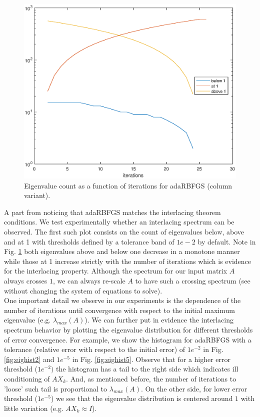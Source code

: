 \documentclass[12pt,conference,compsocconf]{IEEEtran}
\begin{document}
\begin{figure}[H]
  \centering
  \includegraphics[height=0.7\columnwidth,width=1.0\columnwidth]{eigvalcountiter.eps}
  
  \vspace{-2mm}
  \caption{Eigenvalue count as a function of iterations for adaRBFGS (column variant). \label{fig:eigcount}}  
  
\end{figure}
A part from noticing that adaRBFGS matches the interlacing theorem conditions. We test experimentally whether an interlacing spectrum can be observed. The first such plot consists on the count of eigenvalues below, above and at 1 with thresholds defined by a tolerance band of $1e-2$ by default. Note in Fig. \ref{fig:eigcount} both eigenvalues above and below one decrease in a monotone manner while those at 1 increase strictly with the number of iterations which is evidence for the interlacing property. Although the spectrum for our input matrix $A$ always crosses $1$, we can always re-scale $A$ to have such a crossing spectrum (see \cite{Stich1,Gratton} without changing the system of equations to solve).\\
One important detail we observe in our experiments is the dependence of the number of iterations until convergence with respect to the initial maximum eigenvalue (e.g. $\lambda_{max}(A)$). We can further put in evidence the interlacing spectrum behavior by plotting the eigenvalue distribution for different thresholds of error convergence. For example, we show the histogram for adaRBFGS with a tolerance (relative error with respect to the initial error) of $1e^{-2}$ in Fig. \ref{fig:eighist2} and $1e^{-5}$ in Fig. \ref{fig:eighist5}. Observe that for a higher error threshold ($1e^{-2})$ the histogram has a tail to the right side which indicates ill conditioning of $AX_k$. And, as mentioned before, the number of iterations to 'loose' such tail is proportional to $\lambda_{max}(A)$. On the other side, for lower error threshold ($1e^{-5}$) we see that the eigenvalue distribution is centered around $1$ with little variation (e.g. $AX_k \approx I$).
\end{document}
